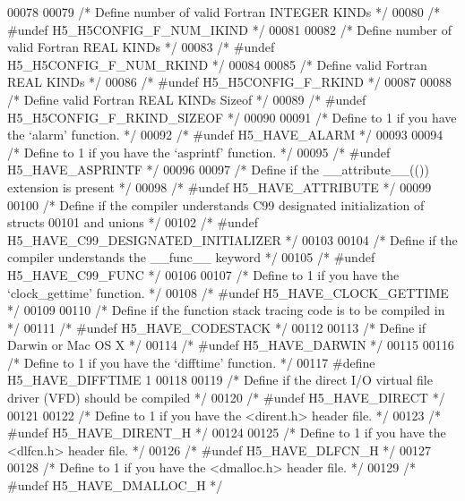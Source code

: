 \begin{DoxyCode}
{00078 
00079 \textcolor{comment}{/* Define number of valid Fortran INTEGER KINDs */}
00080 \textcolor{comment}{/* #undef H5\_H5CONFIG\_F\_NUM\_IKIND */}
00081 
00082 \textcolor{comment}{/* Define number of valid Fortran REAL KINDs */}
00083 \textcolor{comment}{/* #undef H5\_H5CONFIG\_F\_NUM\_RKIND */}
00084 
00085 \textcolor{comment}{/* Define valid Fortran REAL KINDs */}
00086 \textcolor{comment}{/* #undef H5\_H5CONFIG\_F\_RKIND */}
00087 
00088 \textcolor{comment}{/* Define valid Fortran REAL KINDs Sizeof */}
00089 \textcolor{comment}{/* #undef H5\_H5CONFIG\_F\_RKIND\_SIZEOF */}
00090 
00091 \textcolor{comment}{/* Define to 1 if you have the `alarm' function. */}
00092 \textcolor{comment}{/* #undef H5\_HAVE\_ALARM */}
00093 
00094 \textcolor{comment}{/* Define to 1 if you have the `asprintf' function. */}
00095 \textcolor{comment}{/* #undef H5\_HAVE\_ASPRINTF */}
00096 
00097 \textcolor{comment}{/* Define if the \_\_attribute\_\_(()) extension is present */}
00098 \textcolor{comment}{/* #undef H5\_HAVE\_ATTRIBUTE */}
00099 
00100 \textcolor{comment}{/* Define if the compiler understands C99 designated initialization of structs}
00101 \textcolor{comment}{   and unions */}
00102 \textcolor{comment}{/* #undef H5\_HAVE\_C99\_DESIGNATED\_INITIALIZER */}
00103 
00104 \textcolor{comment}{/* Define if the compiler understands the \_\_func\_\_ keyword */}
00105 \textcolor{comment}{/* #undef H5\_HAVE\_C99\_FUNC */}
00106 
00107 \textcolor{comment}{/* Define to 1 if you have the `clock\_gettime' function. */}
00108 \textcolor{comment}{/* #undef H5\_HAVE\_CLOCK\_GETTIME */}
00109 
00110 \textcolor{comment}{/* Define if the function stack tracing code is to be compiled in */}
00111 \textcolor{comment}{/* #undef H5\_HAVE\_CODESTACK */}
00112 
00113 \textcolor{comment}{/* Define if Darwin or Mac OS X */}
00114 \textcolor{comment}{/* #undef H5\_HAVE\_DARWIN */}
00115 
00116 \textcolor{comment}{/* Define to 1 if you have the `difftime' function. */}
00117 \textcolor{preprocessor}{#define H5\_HAVE\_DIFFTIME 1}
00118 
00119 \textcolor{comment}{/* Define if the direct I/O virtual file driver (VFD) should be compiled */}
00120 \textcolor{comment}{/* #undef H5\_HAVE\_DIRECT */}
00121 
00122 \textcolor{comment}{/* Define to 1 if you have the <dirent.h> header file. */}
00123 \textcolor{comment}{/* #undef H5\_HAVE\_DIRENT\_H */}
00124 
00125 \textcolor{comment}{/* Define to 1 if you have the <dlfcn.h> header file. */}
00126 \textcolor{comment}{/* #undef H5\_HAVE\_DLFCN\_H */}
00127 
00128 \textcolor{comment}{/* Define to 1 if you have the <dmalloc.h> header file. */}
00129 \textcolor{comment}{/* #undef H5\_HAVE\_DMALLOC\_H */}
}
\end{DoxyCode}
